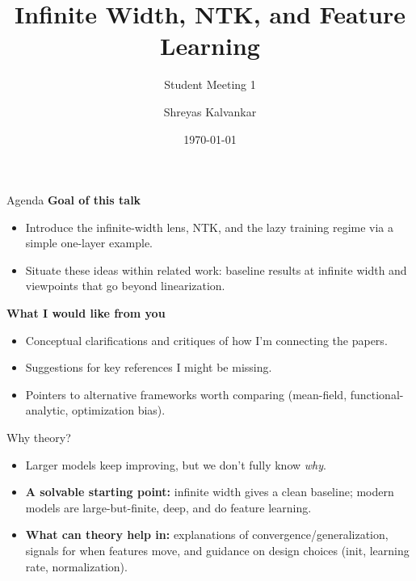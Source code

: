 \documentclass[10pt,aspectratio=169]{beamer}
\title{Infinite Width, NTK, and Feature Learning}
\subtitle{Student Meeting 1}
\author{Shreyas Kalvankar}
\institute{TU Delft}
\date{\today}
\begin{document}
\maketitle

\begin{frame}{Agenda}
	\textbf{Goal of this talk}
	\begin{itemize}
		\item Introduce the infinite-width lens, NTK, and the lazy training regime via a simple one-layer example.
		\item Situate these ideas within related work: baseline results at infinite width and viewpoints that go beyond linearization.
	\end{itemize}
	\medskip
	\textbf{What I would like from you}
	\begin{itemize}
		\item Conceptual clarifications and critiques of how I’m connecting the papers.
		\item Suggestions for key references I might be missing.
		\item Pointers to alternative frameworks worth comparing (mean-field, functional-analytic, optimization bias).
	\end{itemize}

\end{frame}

\begin{frame}{Why theory?}
	\begin{itemize}
		\item Larger models keep improving, but we don’t fully know \emph{why}.
		      \pause
		\item \textbf{A solvable starting point:} infinite width gives a clean
		      baseline; modern models are large-but-finite, deep, and do feature
		      learning.
		      \pause
		\item \textbf{What can theory help in:} explanations of
		      convergence/generalization, signals for when features move, and
		      guidance on design choices (init, learning rate, normalization).
	\end{itemize}

\end{frame}
\end{document}
